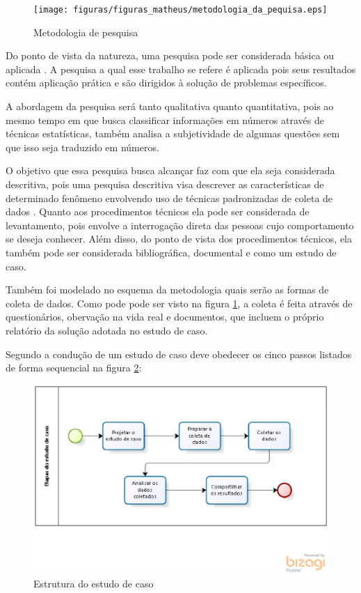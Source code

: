 \begin{figure}[h!]
\centering
\texttt{[image: figuras/figuras\_matheus/metodologia\_da\_pequisa.eps]}
\caption{Metodologia de pesquisa}
\label{fig:metodologiadepesquisa}
\end{figure}
\FloatBarrier

Do ponto de vista da natureza, uma pesquisa pode ser considerada básica ou aplicada \cite{metodologia_edna}. A pesquisa a qual esse trabalho se refere é aplicada pois seus resultados contém aplicação prática e são dirigidos à solução de problemas específicos.

A abordagem da pesquisa será tanto qualitativa quanto quantitativa, pois ao mesmo tempo em que busca classificar informações em números através de técnicas estatísticas, também analisa a subjetividade de algumas questões sem que isso seja traduzido em números.

O objetivo que essa pesquisa busca alcançar faz com que ela seja considerada descritiva, pois uma pesquisa descritiva visa descrever as características de determinado fenômeno envolvendo uso de técnicas padronizadas de coleta de dados \cite{metodologia_edna}. Quanto aos procedimentos técnicos ela pode ser considerada de levantamento, pois envolve a interrogação direta das pessoas cujo comportamento se deseja conhecer. Além disso, do ponto de vista dos procedimentos técnicos, ela também pode ser considerada bibliográfica, documental e como um estudo de caso.

Também foi modelado no esquema da metodologia quais serão as formas de coleta de dados. Como pode pode ser visto na figura \ref{fig:metodologiadepesquisa}, a coleta é feita através de questionários, obervação na vida real e documentos, que incluem o próprio relatório da solução adotada no estudo de caso.

Segundo  a condução de um estudo de caso deve obedecer os cinco passos listados de forma sequencial na figura \ref{fig:estudodecaso}: 

\begin{figure}[h!]
\centering
\includegraphics[keepaspectratio=false,scale=0.8]{figuras/figuras_matheus/estudodecaso.eps}
\caption{Estrutura do estudo de caso}
\label{fig:estudodecaso}
\end{figure}
\FloatBarrier

